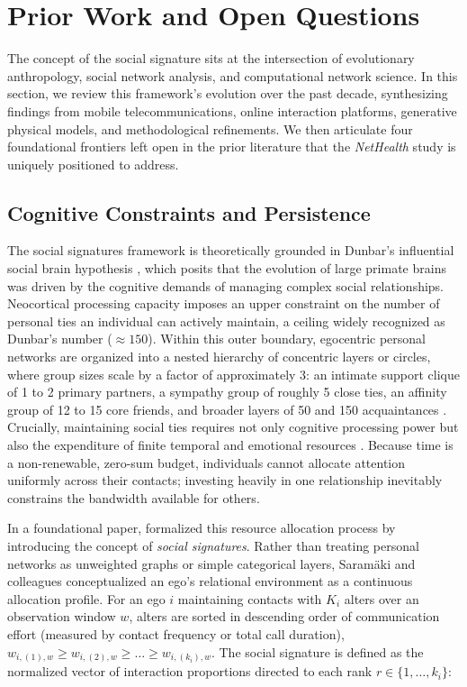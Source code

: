 \documentclass[11pt,letterpaper]{article}
\begin{document}
\section{Prior Work and Open Questions}

The concept of the social signature sits at the intersection of evolutionary anthropology, social network analysis, and computational network science. In this section, we review this framework's evolution over the past decade, synthesizing findings from mobile telecommunications, online interaction platforms, generative physical models, and methodological refinements. We then articulate four foundational frontiers left open in the prior literature that the \textit{NetHealth} study is uniquely positioned to address.

\subsection{Cognitive Constraints and Persistence}

The social signatures framework is theoretically grounded in Dunbar's influential social brain hypothesis \citep{dunbar1992neocortex,dunbar1998social,dunbar2018anatomy}, which posits that the evolution of large primate brains was driven by the cognitive demands of managing complex social relationships. Neocortical processing capacity imposes an upper constraint on the number of personal ties an individual can actively maintain, a ceiling widely recognized as Dunbar's number ($\approx 150$). Within this outer boundary, egocentric personal networks are organized into a nested hierarchy of concentric layers or circles, where group sizes scale by a factor of approximately 3: an intimate support clique of 1 to 2 primary partners, a sympathy group of roughly 5 close ties, an affinity group of 12 to 15 core friends, and broader layers of 50 and 150 acquaintances \citep{roberts2009exploring,sutcliffe2012relationships}. Crucially, maintaining social ties requires not only cognitive processing power but also the expenditure of finite temporal and emotional resources \citep{miritello2013time}. Because time is a non-renewable, zero-sum budget, individuals cannot allocate attention uniformly across their contacts; investing heavily in one relationship inevitably constrains the bandwidth available for others. 

In a foundational paper, \citet{saramaeki2014persistence} formalized this resource allocation process by introducing the concept of \textit{social signatures}. Rather than treating personal networks as unweighted graphs or simple categorical layers, Saram{\"a}ki and colleagues conceptualized an ego's relational environment as a continuous allocation profile. For an ego $i$ maintaining contacts with $K_i$ alters over an observation window $w$, alters are sorted in descending order of communication effort (measured by contact frequency or total call duration), $w_{i,(1),w} \ge w_{i,(2),w} \ge \dots \ge w_{i,(k_i),w}$. The social signature is defined as the normalized vector of interaction proportions directed to each rank $r \in \{1, \dots, k_i\}$:
\end{document}
